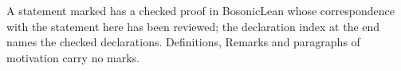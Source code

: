 \documentclass[11pt]{article}
\numberwithin{equation}{section}
\theoremstyle{definition}
\theoremstyle{plain}
\newcommand{\revtag}[1]{#1}
\begin{document}
\medskip
\noindent\revtag{A statement marked
\BosonicLeanTag{} has a checked proof in BosonicLean whose correspondence with the statement
here has been reviewed; the declaration index at the end names the checked declarations. Definitions, Remarks and paragraphs of motivation carry no marks.}




\clearpage














\end{document}
